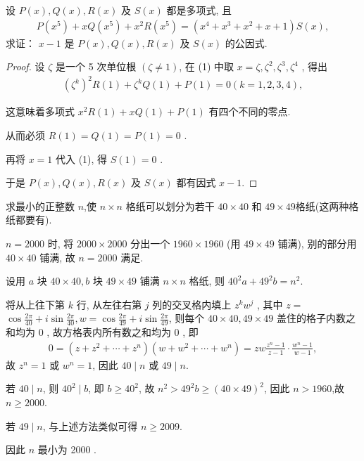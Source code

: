 \begin{example}
	设 $P(x), Q(x), R(x)$ 及 $S(x)$ 都是多项式, 且
	\begin{align*}
		P\left(x^5\right)+x Q\left(x^5\right)+x^2 R\left(x^5\right)=\left(x^4+x^3+x^2+x+1\right) S(x),
	\end{align*}
	求证： $x-1$ 是 $P(x), Q(x), R(x)$ 及 $S(x)$ 的公因式.
\end{example}
\begin{proof}
	设 $\zeta$ 是一个 5 次单位根 $(\zeta \neq 1)$, 在 (1) 中取 $x=\zeta, \zeta^2, \zeta^3, \zeta^4$ , 得出
	\begin{align*}
		\left(\zeta^k\right)^2 R(1)+\zeta^k Q(1)+P(1)=0(k=1,2,3,4),
	\end{align*}

	这意味着多项式 $x^2 R(1)+x Q(1)+P(1)$ 有四个不同的零点.

	从而必须 $R(1)=Q(1)=P(1)=0$ .

	再将 $x=1$ 代入 (1), 得 $S(1)=0$ .

	于是 $P(x), Q(x), R(x)$ 及 $S(x)$ 都有因式 $x-1$.
\end{proof}

\begin{example}
	求最小的正整数 $n$,使 $n \times n$ 格纸可以划分为若干 $40 \times 40$ 和 $49 \times 49$格纸(这两种格纸都要有).
\end{example}
\begin{solution}
	$n=2000$ 时, 将 $2000 \times 2000$ 分出一个 $1960 \times 1960$ (用 $49 \times 49$ 铺满), 别的部分用 $40 \times 40$ 铺满, 故 $n=2000$ 满足.

	设用 $a$ 块 $40 \times 40, b$ 块 $49 \times 49$ 铺满 $n \times n$ 格纸, 则 $40^2 a+49^2 b=n^2$.

	将从上往下第 $k$ 行, 从左往右第 $j$ 列的交叉格内填上 $z^k w^j$ , 其中 $z=$ $\cos \frac{2 \pi}{40}+i \sin \frac{2 \pi}{40}, w=\cos \frac{2 \pi}{49}+i \sin \frac{2 \pi}{49}$, 则每个 $40 \times 40 ,  49 \times 49$ 盖住的格子内数之和均为 0 , 故方格表内所有数之和均为 0 , 即
	\begin{align*}
		0=\left(z+z^2+\cdots+z^n\right)\left(w+w^2+\cdots+w^n\right)=z w \frac{z^n-1}{z-1} \cdot \frac{w^n-1}{w-1},
	\end{align*}
	故 $z^n=1$ 或 $w^n=1$, 因此 $40 \mid n$ 或 $49 \mid n$.

	若 $40 \mid n$, 则 $40^2 \mid b$, 即 $b \geqslant 40^2$, 故 $n^2>49^2 b \geqslant(40 \times 49)^2$, 因此 $n>1960$,故 $n \geqslant 2000$.

	若 $49 \mid n$, 与上述方法类似可得 $n \geqslant 2009$.

	因此 $n$ 最小为 2000 .
\end{solution}


